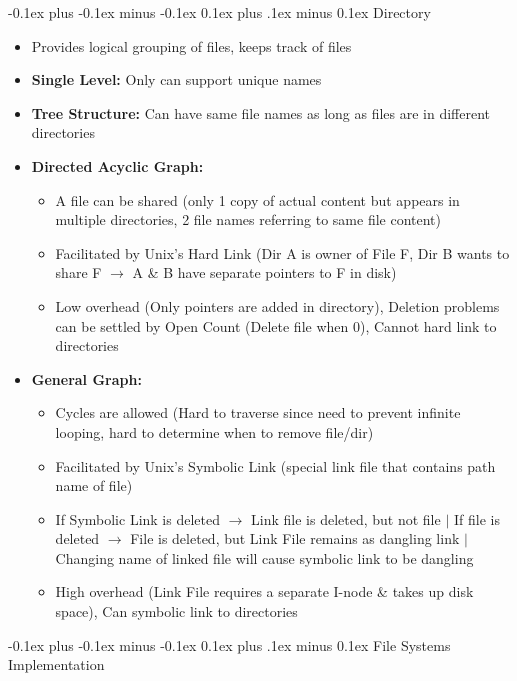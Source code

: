 \documentclass[landscape]{article}
\makeatletter
\renewcommand{\section}{\@startsection{section}{1}{0mm}%
  {-0.1ex plus -0.1ex minus -0.1ex}%
  {0.1ex plus .1ex minus 0.1ex}%
{\normalfont\small\bfseries}}
\renewcommand{\subsection}{\@startsection{subsection}{2}{0mm}%
  {-0.1ex plus -0.1ex minus -0.1ex}%
  {0.1ex plus .1ex minus 0.1ex}%
{\normalfont\scriptsize\bfseries}}
\makeatother
\begin{document}
\begin{multicols*}{6}
    \subsection{Directory}
    \begin{itemize}
      \item Provides logical grouping of files, keeps track of files
      \item \textbf{Single Level:} Only can support unique names
      \item \textbf{Tree Structure:} Can have same file names as long as files are in different directories
      \item \textbf{Directed Acyclic Graph:}
      \begin{itemize}
        \item A file can be shared (only 1 copy of actual content but appears in multiple directories, 2 file names referring to same file content)
        \item Facilitated by Unix's Hard Link (Dir A is owner of File F, Dir B wants to share F $\rightarrow$ A \& B have separate pointers to F in disk)
        \item Low overhead (Only pointers are added in directory), Deletion problems can be settled by Open Count (Delete file when 0), Cannot hard link to directories
      \end{itemize}
      \item \textbf{General Graph:}
      \begin{itemize}
        \item Cycles are allowed (Hard to traverse since need to prevent infinite looping, hard to determine when to remove file/dir)
        \item Facilitated by Unix's Symbolic Link (special link file that contains path name of file)
        \item If Symbolic Link is deleted $\rightarrow$ Link file is deleted, but not file $\vert$ If file is deleted $\rightarrow$ File is deleted, but Link File remains as dangling link $\vert$ Changing name of linked file will cause symbolic link to be dangling
        \item High overhead (Link File requires a separate I-node \& takes up disk space), Can symbolic link to directories
      \end{itemize}
    \end{itemize}

    \section{File Systems Implementation}

\end{multicols*}
\end{document}
